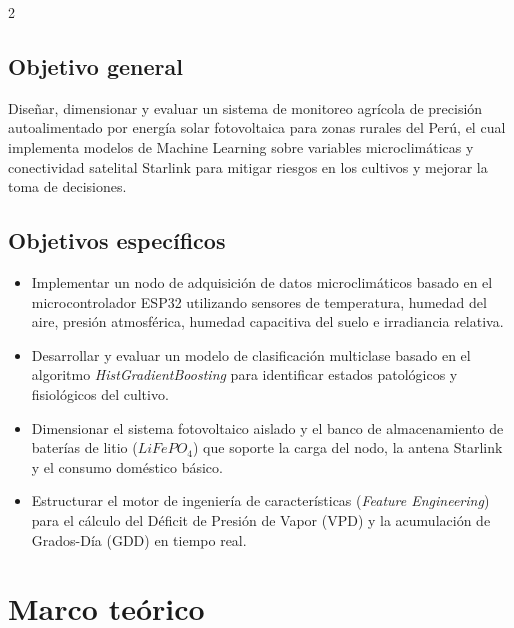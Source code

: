 \documentclass[a4paper, 11pt]{article}
\begin{document}
\begin{multicols}{2}
\subsection{Objetivo general}
Diseñar, dimensionar y evaluar un sistema de monitoreo agrícola de precisión autoalimentado por energía solar fotovoltaica para zonas rurales del Perú, el cual implementa modelos de Machine Learning sobre variables microclimáticas y conectividad satelital Starlink para mitigar riesgos en los cultivos y mejorar la toma de decisiones.

\subsection{Objetivos específicos}
\begin{itemize}
    \item Implementar un nodo de adquisición de datos microclimáticos basado en el microcontrolador ESP32 utilizando sensores de temperatura, humedad del aire, presión atmosférica, humedad capacitiva del suelo e irradiancia relativa.
    \item Desarrollar y evaluar un modelo de clasificación multiclase basado en el algoritmo \textit{HistGradientBoosting} para identificar estados patológicos y fisiológicos del cultivo.
    \item Dimensionar el sistema fotovoltaico aislado y el banco de almacenamiento de baterías de litio ($LiFePO_4$) que soporte la carga del nodo, la antena Starlink y el consumo doméstico básico.
    \item Estructurar el motor de ingeniería de características (\textit{Feature Engineering}) para el cálculo del Déficit de Presión de Vapor (VPD) y la acumulación de Grados-Día (GDD) en tiempo real.
\end{itemize}

\section{Marco teórico}


\end{multicols}
\end{document}
